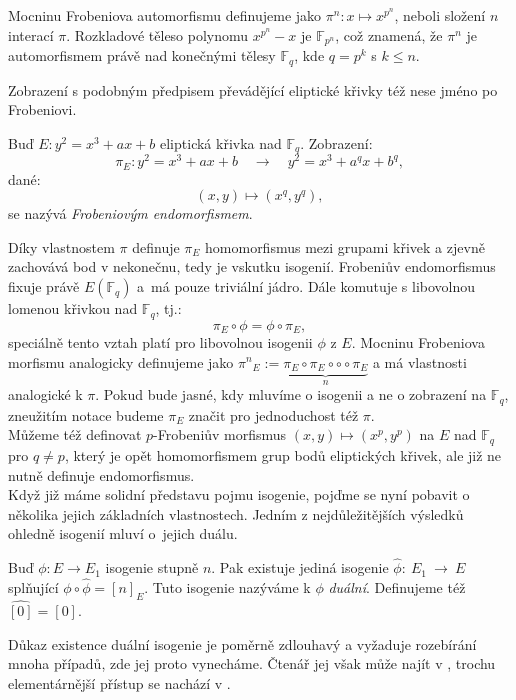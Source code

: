 \documentclass [12pt]{report}
\begin{document}
Mocninu Frobeniova automorfismu definujeme jako $\pi^n : x \mapsto x^{p^n}$, neboli složení $n$ interací $\pi$. Rozkladové těleso polynomu $x^{p^n}-x$ je $\mathbb{F}_{p^n}$, což znamená, že $\pi^n$ je automorfismem právě nad konečnými tělesy $\mathbb{F}_q$, kde $q =p^k$ s $k \leqslant n$. 

Zobrazení s podobným předpisem převádějící eliptické křivky též nese jméno po Frobeniovi.
\begin{definice}
Buď $E: y^2 = x^3+ax+b$ eliptická křivka nad $\mathbb{F}_q$. Zobrazení:
\begin{equation*}
\pi_E : y^2 = x^3+ax+b \quad \longrightarrow \quad y^2 = x^3 + a^q x + b^q,
\end{equation*}
dané:
\begin{equation*}
(x,y) \longmapsto (x^q,y^q),
\end{equation*}
se nazývá \textit{Frobeniovým endomorfismem}.
\end{definice}

Díky vlastnostem $\pi$ definuje $\pi_E$ homomorfismus mezi grupami křivek a zjevně zachovává bod v nekonečnu, tedy je vskutku isogenií. Frobeniův endomorfismus fixuje právě $E(\mathbb{F}_q)$ a~má pouze triviální jádro. Dále komutuje s libovolnou lomenou křivkou nad $\mathbb{F}_q$, tj.:
\begin{equation*}
\pi_E \circ \phi = \phi \circ \pi_E,
\end{equation*}
speciálně tento vztah platí pro libovolnou isogenii $\phi$ z $E$. Mocninu Frobeniova morfismu analogicky definujeme jako ${\pi^n}_E := \underbrace{\pi_E \circ \pi_E \circ \circ \circ \pi_E}_{n}$ a má vlastnosti analogické k $\pi$. Pokud bude jasné, kdy mluvíme o isogenii a ne o zobrazení na $\mathbb{F}_q$, zneužitím notace budeme $\pi_E$ značit pro jednoduchost též $\pi$.\\

Můžeme též definovat $p$-Frobeniův morfismus $(x,y) \mapsto (x^p,y^p)$ na $E$ nad $\mathbb{F}_q$ pro $q \neq p$, který je opět homomorfismem grup bodů eliptických křivek, ale již ne nutně definuje endomorfismus.\\

Když již máme solidní představu pojmu isogenie, pojďme se nyní pobavit o několika jejich základních vlastnostech. Jedním z nejdůležitějších výsledků ohledně isogenií mluví o~jejich duálu.

\begin{veta}
Buď $\phi: E \longrightarrow E_1$ isogenie stupně $n$. Pak existuje jediná isogenie $\hat{\phi}:~E_1~\longrightarrow~E$ splňující $\phi \circ \hat{\phi} = [n]_E$. Tuto isogenie nazýváme k $\phi$ \textit{duální}. Definujeme též $\hat{[0]} = [0]$.
\end{veta}
Důkaz existence duální isogenie je poměrně zdlouhavý a vyžaduje rozebírání mnoha případů, zde jej proto vynecháme. Čtenář jej však může najít v \cite[Thm. III.6.1.]{Silverman}, trochu elementárnější přístup se nachází v \cite[Thm. 7.8.]{Sutherland}.\\
\end{document}

